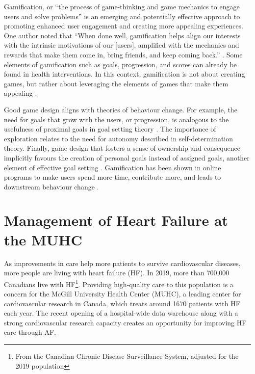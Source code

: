 Gamification, or ``the process of game-thinking and game mechanics to engage users and solve problems'' \cite{zichermann2011gamification} is an emerging and potentially effective approach to promoting enhanced user engagement and creating more appealing experiences. One author noted that ``When done well, gamification helps align our interests with the intrinsic motivations of our [users], amplified with the mechanics and rewards that make them come in, bring friends, and keep coming back.'' \cite{zichermann2011gamification}. Some elements of gamification such as goals, progression, and scores can already be found in health interventions. In this context, gamification is not about creating games, but rather about leveraging the elements of games that make them appealing \cite{deterding2011game}.

Good game design aligns with theories of behaviour change. For example, the need for goals that grow with the users, or progression, is analogous to the usefulness of proximal goals in goal setting theory \cite{locke2002building}. The importance of exploration relates to the need for autonomy described in self-determination theory. Finally, game design that fosters a sense of ownership and consequence implicitly favours the creation of personal goals instead of assigned goals, another element of effective goal setting \cite{locke1990theory}. Gamification has been shown in online programs to make users spend more time, contribute more, and leads to downstream behaviour change \cite{looyestyn2017does}.

\section{Management of Heart Failure at the MUHC}
As improvements in care help more patients to survive cardiovascular diseases, more people are living with heart failure (\gls{HF}). In 2019, more than 700,000 Canadians live with \gls{HF}\footnote{From the Canadian Chronic Disease Surveillance System, adjusted for the 2019 population}. Providing high-quality care to this population is a concern for the McGill University Health Center (\gls{MUHC}), a leading center for cardiovascular research in Canada, which treats around 1670 patients with \gls{HF} each year. The recent opening of a hospital-wide data warehouse along with a strong cardiovascular research capacity creates an opportunity for improving \gls{HF} care through \gls{AF}.

